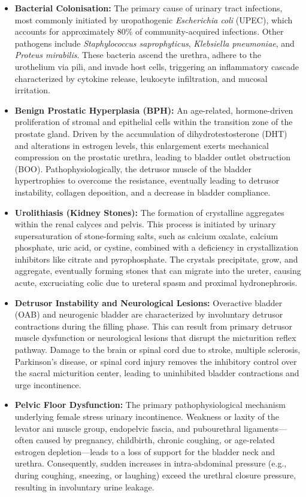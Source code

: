 \begin{itemize}
    \item \textbf{Bacterial Colonisation:} The primary cause of urinary tract infections, most commonly initiated by uropathogenic \textit{Escherichia coli} (UPEC), which accounts for approximately 80\% of community-acquired infections. Other pathogens include \textit{Staphylococcus saprophyticus}, \textit{Klebsiella pneumoniae}, and \textit{Proteus mirabilis}. These bacteria ascend the urethra, adhere to the urothelium via pili, and invade host cells, triggering an inflammatory cascade characterized by cytokine release, leukocyte infiltration, and mucosal irritation.
    \item \textbf{Benign Prostatic Hyperplasia (BPH):} An age-related, hormone-driven proliferation of stromal and epithelial cells within the transition zone of the prostate gland. Driven by the accumulation of dihydrotestosterone (DHT) and alterations in estrogen levels, this enlargement exerts mechanical compression on the prostatic urethra, leading to bladder outlet obstruction (BOO). Pathophysiologically, the detrusor muscle of the bladder hypertrophies to overcome the resistance, eventually leading to detrusor instability, collagen deposition, and a decrease in bladder compliance.
    \item \textbf{Urolithiasis (Kidney Stones):} The formation of crystalline aggregates within the renal calyces and pelvis. This process is initiated by urinary supersaturation of stone-forming salts, such as calcium oxalate, calcium phosphate, uric acid, or cystine, combined with a deficiency in crystallization inhibitors like citrate and pyrophosphate. The crystals precipitate, grow, and aggregate, eventually forming stones that can migrate into the ureter, causing acute, excruciating colic due to ureteral spasm and proximal hydronephrosis.
    \item \textbf{Detrusor Instability and Neurological Lesions:} Overactive bladder (OAB) and neurogenic bladder are characterized by involuntary detrusor contractions during the filling phase. This can result from primary detrusor muscle dysfunction or neurological lesions that disrupt the micturition reflex pathway. Damage to the brain or spinal cord due to stroke, multiple sclerosis, Parkinson's disease, or spinal cord injury removes the inhibitory control over the sacral micturition center, leading to uninhibited bladder contractions and urge incontinence.
    \item \textbf{Pelvic Floor Dysfunction:} The primary pathophysiological mechanism underlying female stress urinary incontinence. Weakness or laxity of the levator ani muscle group, endopelvic fascia, and pubourethral ligaments---often caused by pregnancy, childbirth, chronic coughing, or age-related estrogen depletion---leads to a loss of support for the bladder neck and urethra. Consequently, sudden increases in intra-abdominal pressure (e.g., during coughing, sneezing, or laughing) exceed the urethral closure pressure, resulting in involuntary urine leakage.
\end{itemize}

